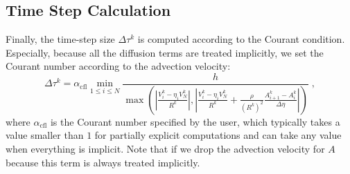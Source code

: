 \documentclass{amsart}
\theoremstyle{definition}
\theoremstyle{remark}
\numberwithin{equation}{section}
\numberwithin{figure}{section}
\newcommand{\abs}[1]{\left|#1\right|}
\begin{document}
\subsection{Time Step Calculation}
Finally, the time-step size $\Delta\tau^k$ is computed according to the Courant condition.
Especially, because all the diffusion terms are treated implicitly, we set the Courant number according to the advection velocity:
\begin{equation}\label{eq:num_dtau}
\Delta\tau^k = \alpha_{\textrm{cfl}}\min_{1\le i\le N}\frac{h}{\max(\abs{\frac{V_i^k-\eta_iV_N^k}{R^k}},\abs{\frac{V_i^k-\eta_iV_N^k}{R^k}+\frac{\rho}{(R^k)^2}\frac{A_{i+1}^k-A_i^k}{\Delta\eta}})}\;,
\end{equation}
where $\alpha_{\textrm{cfl}}$ is the Courant number specified by the user, which typically takes a value smaller than $1$ for partially explicit computations and can take any value when everything is implicit.
Note that if we drop the advection velocity for $A$ because this term is always treated implicitly.
\end{document}
